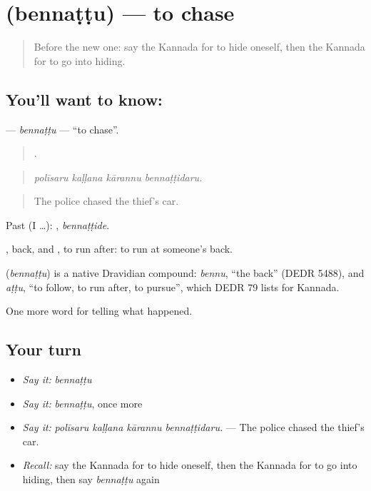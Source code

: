 \section[\texorpdfstring{\kn{ಬೆನ್ನಟ್ಟು} (bennaṭṭu)}{ಬೆನ್ನಟ್ಟು (bennaṭṭu)}]{ (bennaṭṭu) — to chase}

\label{lesson:KA-C345-bennattu}



\begin{quote}
Before the new one: say the Kannada for to hide oneself, then the Kannada for to go into hiding.
\end{quote}

\subsection*{You'll want to know: }
\textbf{} — \emph{bennaṭṭu} — \textquotedblleft{}to chase\textquotedblright{}.

\begin{quote}
   .
\end{quote}

\begin{quote}
\emph{polīsaru kaḷḷana kārannu bennaṭṭidaru.}
\end{quote}

\begin{quote}
The police chased the thief's car.
\end{quote}

Past (I …): , \emph{bennaṭṭide}.

, back, and , to run after: to run at someone's back.

\begin{cousinweb}
\textbf{} (\emph{bennaṭṭu}) is a native Dravidian compound: \emph{bennu}, \textquotedblleft{}the back\textquotedblright{} (DEDR 5488), and \emph{aṭṭu}, \textquotedblleft{}to follow, to run after, to pursue\textquotedblright{}, which DEDR 79 lists for Kannada.
\end{cousinweb}

\begin{grammarlens}[title={What you've built}]
One more word for telling what happened.
\end{grammarlens}

\subsection*{Your turn}
\begin{itemize}
\raggedright
  \item \emph{Say it:} \emph{bennaṭṭu}
  \item \emph{Say it:} \emph{bennaṭṭu}, once more
  \item \emph{Say it:} \emph{polīsaru kaḷḷana kārannu bennaṭṭidaru.} — The police chased the thief's car.
  \item \emph{Recall:} say the Kannada for to hide oneself, then the Kannada for to go into hiding, then say \emph{bennaṭṭu} again
\end{itemize}

